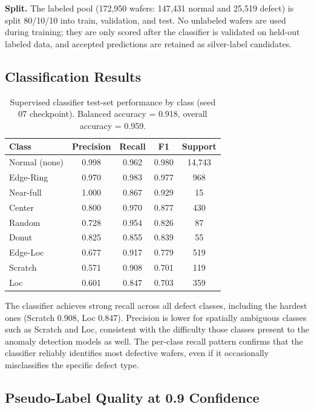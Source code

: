 \documentclass[11pt]{article}
\begin{document}
\textbf{Split.} The labeled pool (172,950 wafers: 147,431 normal and 25,519 defect) is split 80/10/10 into train, validation, and test. No unlabeled wafers are used during training; they are only scored after the classifier is validated on held-out labeled data, and accepted predictions are retained as silver-label candidates.

\subsection{Classification Results}

\begin{table}[H]
\centering
\caption{Supervised classifier test-set performance by class (seed 07 checkpoint). Balanced accuracy = 0.918, overall accuracy = 0.959.}
\label{tab:classifier_results}
\begin{tabular}{lcccc}
\toprule
Class & Precision & Recall & F1 & Support \\
\midrule
Normal (none) & 0.998 & 0.962 & 0.980 & 14{,}743 \\
Edge-Ring     & 0.970 & 0.983 & 0.977 & 968 \\
Near-full     & 1.000 & 0.867 & 0.929 & 15 \\
Center        & 0.800 & 0.970 & 0.877 & 430 \\
Random        & 0.728 & 0.954 & 0.826 & 87 \\
Donut         & 0.825 & 0.855 & 0.839 & 55 \\
Edge-Loc      & 0.677 & 0.917 & 0.779 & 519 \\
Scratch       & 0.571 & 0.908 & 0.701 & 119 \\
Loc           & 0.601 & 0.847 & 0.703 & 359 \\
\bottomrule
\end{tabular}
\end{table}

The classifier achieves strong recall across all defect classes, including the hardest ones (Scratch 0.908, Loc 0.847). Precision is lower for spatially ambiguous classes such as Scratch and Loc, consistent with the difficulty those classes present to the anomaly detection models as well. The per-class recall pattern confirms that the classifier reliably identifies most defective wafers, even if it occasionally misclassifies the specific defect type.

\subsection{Pseudo-Label Quality at 0.9 Confidence}
\end{document}
